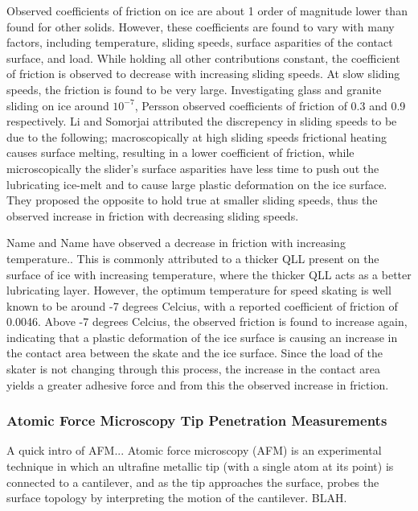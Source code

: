Observed coefficients of friction on ice are about 1 order of
magnitude lower than found for other solids. However, these
coefficients are found to vary with many factors, including
temperature, sliding speeds, surface asparities of the contact
surface, and load.\cite{Evans1976,Kietzig2002,Persson2001,Persson2015} While
holding all other contributions constant, the coefficient of friction
is observed to decrease with increasing sliding speeds. At slow
sliding speeds, the friction is found to be very large. Investigating
glass and granite sliding on ice around $10^{-7}$, Persson observed
coefficients of friction of 0.3 and 0.9 respectively.\cite{Persson2000} Li and
Somorjai attributed the discrepency in sliding speeds to be due to the
following; macroscopically at high sliding speeds frictional heating
causes surface melting, resulting in a lower coefficient of friction,
while microscopically the slider's surface asparities have less time
to push out the lubricating ice-melt and to cause large plastic
deformation on the ice surface.\cite{Li2007} They proposed the
opposite to hold true at smaller sliding speeds, thus the observed
increase in friction with decreasing sliding speeds.

Name and Name have observed a decrease in friction with increasing
temperature.\cite{Evans1976,Colbeck1997}. This is commonly attributed to a
thicker QLL present on the surface of ice with increasing temperature,
where the thicker QLL acts as a better lubricating layer. However, the
optimum temperature for speed skating is well known to be around -7
degrees Celcius, with a reported coefficient of friction of
0.0046.\cite{Dekoning1992} Above -7 degrees Celcius, the observed
friction is found to increase again, indicating that a plastic
deformation of the ice surface is causing an increase in the contact
area between the skate and the ice surface.\cite{Barnes1966,Barnes1971}
Since the load of the skater is not changing through this process, the
increase in the contact area yields a greater adhesive force and from
this the observed increase in friction.

\subsubsection{Atomic Force Microscopy Tip Penetration Measurements}
A quick intro of AFM...  Atomic force microscopy (AFM) is an
experimental technique in which an ultrafine metallic tip (with a
single atom at its point) is connected to a cantilever, and as the tip
approaches the surface, probes the surface topology by interpreting
the motion of the cantilever. BLAH. 

